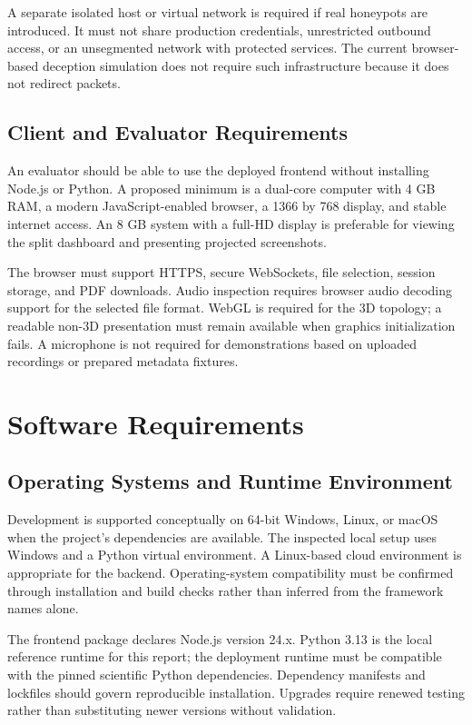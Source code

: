 \documentclass[12pt,a4paper,oneside]{report}
\begin{document}
A separate isolated host or virtual network is required if real honeypots are introduced. It must not share production credentials, unrestricted outbound access, or an unsegmented network with protected services. The current browser-based deception simulation does not require such infrastructure because it does not redirect packets.

\subsection{Client and Evaluator Requirements}

An evaluator should be able to use the deployed frontend without installing Node.js or Python. A proposed minimum is a dual-core computer with 4 GB RAM, a modern JavaScript-enabled browser, a 1366 by 768 display, and stable internet access. An 8 GB system with a full-HD display is preferable for viewing the split dashboard and presenting projected screenshots.

The browser must support HTTPS, secure WebSockets, file selection, session storage, and PDF downloads. Audio inspection requires browser audio decoding support for the selected file format. WebGL is required for the 3D topology; a readable non-3D presentation must remain available when graphics initialization fails. A microphone is not required for demonstrations based on uploaded recordings or prepared metadata fixtures.

\section{Software Requirements}

\subsection{Operating Systems and Runtime Environment}

Development is supported conceptually on 64-bit Windows, Linux, or macOS when the project's dependencies are available. The inspected local setup uses Windows and a Python virtual environment. A Linux-based cloud environment is appropriate for the backend. Operating-system compatibility must be confirmed through installation and build checks rather than inferred from the framework names alone.

The frontend package declares Node.js version 24.x. Python 3.13 is the local reference runtime for this report; the deployment runtime must be compatible with the pinned scientific Python dependencies. Dependency manifests and lockfiles should govern reproducible installation. Upgrades require renewed testing rather than substituting newer versions without validation.
\end{document}
